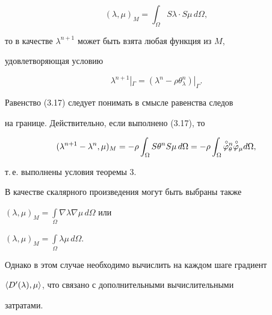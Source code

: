 $$ 


(\lambda,\mu)_M=\int_\Omega S\lambda\cdot S\mu\,d\Omega, 


$$ 


то в качестве $\lambda^{n+1}$ может быть взята любая функция из $M$, 


удовлетворяющая условию 


\begin{equation} 


\lambda^{n+1}|_\Gamma=(\lambda^n-\rho\theta^n_\lambda)|_\Gamma. 


\end{equation} 


 


Равенство (3.17) следует понимать в смысле равенства следов 


на границе. Действительно, если выполнено (3.17), то 


$$ 


(\lambda^{n+1}-\lambda^n,\mu)_M=-\rho\int_\Omega S\theta^n S\mu\,d\Omega= 


-\rho\int_\Omega\up{\varphi}^n_\theta\up{\varphi}_\mu d\Omega, 


$$ 


т.\,е. выполнены условия теоремы 3. 


 


В качестве скалярного произведения могут быть выбраны также 


$(\lambda,\mu)_M=\int\limits_\Omega\nabla\lambda\nabla\mu\,d\Omega$ или 


$(\lambda,\mu)_M=\int\limits_\Omega\lambda\mu\,d\Omega$. 


Однако в этом случае необходимо вычислить на каждом шаге градиент 


$\langle D'(\lambda),\mu\rangle$, что связано с дополнительными вычислительными 


затратами. 


 


 


